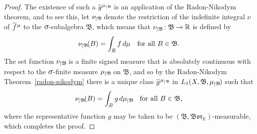 \documentclass[
twoside=true,
paper=letter,
fontsize=9pt,
pagesize=auto,
leqno,
openany,
headsepline,
overfullrule,
]{scrbook}
\theoremstyle{plain}
\theoremstyle{plain}
\theoremstyle{definition}
\theoremstyle{bfnoteitalic}
\theoremstyle{bfnoteroman}
\newcommand{\sigalg}[1]{\mathfrak{#1}}
\newcommand{\borel}{\mathfrak{Bor}}
\newcommand{\textsigma}{\hbox{\large{$\sigma$}}\kern-1pt}
\newcommand{\restrictedto}[1]{_{\lvert#1}\kern-1.5pt}
\newcommand{\R}{\mathbb{R}}
\newcommand{\sigmaalgebraii}{\sigalg{B}}
\newcommand{\function}{f}
\newcommand{\functionii}{g}
\newcommand{\measurespace}{X}
\newcommand{\measure}{\mu}
\newcommand{\measureii}{\nu}
\newcommand*\xbar[1]{%
   \hbox{%
     \vbox{%
       \hrule height 0.4pt %
       \kern0.4ex%
       \hbox{%
         \ensuremath{#1}%
       }%
     }%
   }%
}
\newcommand{\lebclass}[1]{\hspace{.5pt}\xbar{#1}\hspace{0.5pt}}
\newcommand{\ellclass}[2]{\lebclass{#1}^{#2}}
\begin{document}
\begin{proof}
The existence of such a  $\ellclass{\functionii}{\measure\restrictedto{\sigmaalgebraii}}$ is an application of the Radon-Nikodym theorem, and to see this, let $\measureii\restrictedto{\sigmaalgebraii}$ denote the restriction of the indefinite integral $\measureii$ of $\ellclass{\function}{\measure}$ to the $\textsigma$-subalgebra $\sigmaalgebraii$, which means that $\measureii\restrictedto{\sigmaalgebraii} :\sigmaalgebraii\to\R$ is defined by
\[
\measureii\restrictedto{\sigmaalgebraii}(B) 
=
\int_B \function\, d\measure
\quad\text{for all $B\in\sigmaalgebraii$.}
\]
The set function $\measureii\restrictedto{\sigmaalgebraii}$ is a finite signed measure that is absolutely continuous with respect to the $\textsigma$-finite measure $\measure\restrictedto{\sigmaalgebraii}$ on $\sigmaalgebraii$, and so by the Radon-Nikodym Theorem~\ref{radon-nikodym} there is a unique class
$\ellclass{\functionii}{\measure\restrictedto{\sigmaalgebraii}}$ in $L_1(\measurespace, \sigmaalgebraii,\measure\restrictedto{\sigmaalgebraii})$ 
such that
\[
\measureii\restrictedto{\sigmaalgebraii}(B) 
= 
\int_B \functionii \, d\measure\restrictedto{\sigmaalgebraii}
\quad\text{for all $B\in\sigmaalgebraii$,}
\]
where the representative function $\functionii$ may be taken to be $(\sigmaalgebraii, \borel_\R)$\hyp{}measurable,
which completes the proof.
\end{proof}  
\end{document}
